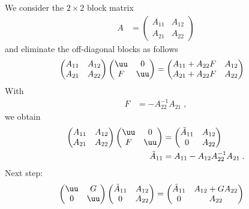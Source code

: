 We consider the $2\times 2$ block matrix
%
\begin{align*}
A &=
\begin{pmatrix}
 A_{11} & A_{12} \\
A_{21}  & A_{22}
\end{pmatrix}
\end{align*}
%
and eliminate the off-diagonal blocks as follows
\begin{align*}
\begin{pmatrix}
 A_{11} & A_{12} \\
A_{21}  & A_{22}
\end{pmatrix}
%
\begin{pmatrix}
 \uu  &  0 \\
F  & \uu 
\end{pmatrix}
%
&=
\begin{pmatrix}
  A_{11} + A_{22} F&  A_{12}\\
  A_{21} + A_{22}F& A_{22} 
\end{pmatrix}
%
\end{align*}
%
With 
%
\begin{align*}
F &=  - A_{22}^{-1} A_{21}\;,
\end{align*}
%
we obtain
\begin{align*}
\begin{pmatrix}
 A_{11} & A_{12} \\
A_{21}  & A_{22}
\end{pmatrix}
%
\begin{pmatrix}
 \uu  &  0 \\
F  & \uu 
\end{pmatrix}
%
&=
\begin{pmatrix}
  \tilde A_{11} &  A_{12}\\
0 & A_{22} 
\end{pmatrix}\\
\tilde A_{11} &= A_{11} - A_{12} A_{22}^{-1}A_{21}\;.
%
\end{align*}
%
Next step:
%
\begin{align*}
\begin{pmatrix}
  \uu& G  \\
  0 & \uu
\end{pmatrix}
%
\begin{pmatrix}
  \tilde A_{11} &  A_{12}\\
0 & A_{22} 
\end{pmatrix} 
&=
\begin{pmatrix}
  \tilde A_{11} &  A_{12} + G A_{22}\\
0 & A_{22} 
\end{pmatrix} 
\end{align*}

